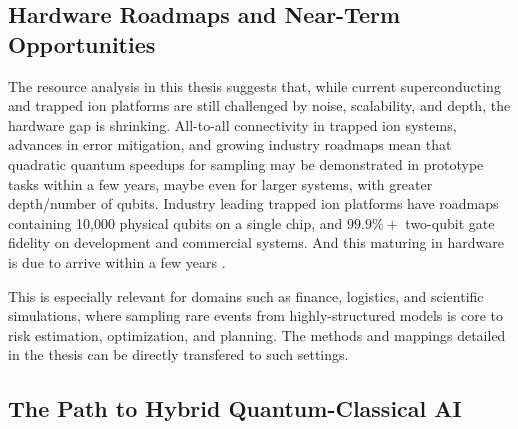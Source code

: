 \documentclass[encoding=utf8,british]{tumphthesis}
\begin{document}
        \subsection{Hardware Roadmaps and Near-Term Opportunities}
        The resource analysis in this thesis suggests that, while current superconducting and trapped ion platforms are still challenged by noise, scalability, and depth, the hardware gap is shrinking. 
        All-to-all connectivity in trapped ion systems, advances in error mitigation, and growing industry roadmaps mean that quadratic quantum speedups for sampling may be demonstrated in prototype tasks 
        within a few years, maybe even for larger systems, with greater depth/number of qubits. Industry leading trapped ion platforms have roadmaps containing 10,000 physical qubits on a single 
        chip, and $99.9\%+$ two-qubit gate fidelity on development and commercial systems. And this maturing in hardware is due to arrive within a few years \cite{ionq_roadmap}.

        This is especially relevant for domains such as finance, logistics, and scientific simulations, where sampling rare events from highly-structured models is core to risk estimation, optimization, 
        and planning. The methods and mappings detailed in the thesis can be directly transfered to such settings.

        \subsection{The Path to Hybrid Quantum-Classical AI}
\end{document}

